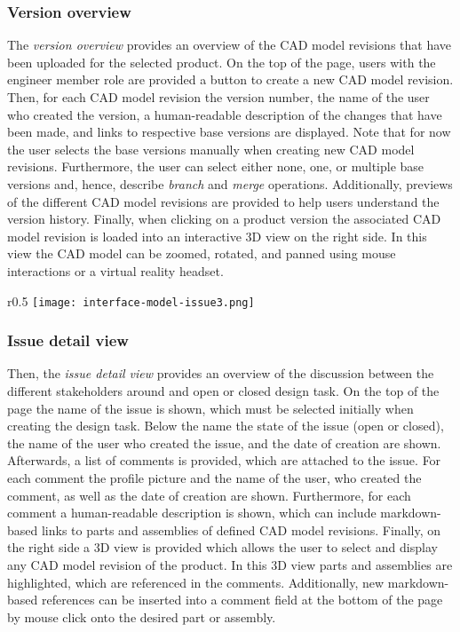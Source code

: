 \subsubsection{Version overview}

The \textit{version overview} provides an overview of the CAD model revisions that have been uploaded for the selected product.
On the top of the page, users with the engineer member role are provided a button to create a new CAD model revision.
Then, for each CAD model revision the version number, the name of the user who created the version, a human-readable description of the changes that have been made, and links to respective base versions are displayed.
Note that for now the user selects the base versions manually when creating new CAD model revisions.
Furthermore, the user can select either none, one, or multiple base versions and, hence, describe \textit{branch} and \textit{merge} operations.
Additionally, previews of the different CAD model revisions are provided to help users understand the version history.
Finally, when clicking on a product version the associated CAD model revision is loaded into an interactive 3D view on the right side.
In this view the CAD model can be zoomed, rotated, and panned using mouse interactions or a virtual reality headset.

\begin{wrapfigure}{r}{0.5\textwidth}
    \centering
    \texttt{[image: interface-model-issue3.png]}
    \label{fig:screenshot-issue}
\end{wrapfigure}

\subsubsection{Issue detail view}

Then, the \textit{issue detail view} provides an overview of the discussion between the different stakeholders around and open or closed design task.
On the top of the page the name of the issue is shown, which must be selected initially when creating the design task.
Below the name the state of the issue (open or closed), the name of the user who created the issue, and the date of creation are shown.
Afterwards, a list of comments is provided, which are attached to the issue.
For each comment the profile picture and the name of the user, who created the comment, as well as the date of creation are shown.
Furthermore, for each comment a human-readable description is shown, which can include markdown-based links to parts and assemblies of defined CAD model revisions.
Finally, on the right side a 3D view is provided which allows the user to select and display any CAD model revision of the product.
In this 3D view parts and assemblies are highlighted, which are referenced in the comments.
Additionally, new markdown-based references can be inserted into a comment field at the bottom of the page by mouse click onto the desired part or assembly.

